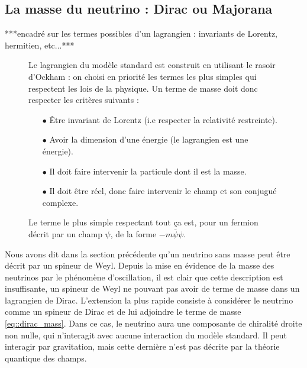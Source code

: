         \subsection{La masse du neutrino : Dirac ou Majorana}\label{sec::dirac_majorana}
        
	        ***encadré sur les termes possibles d'un lagrangien : invariants de Lorentz, hermitien, etc...***
	        \begin{figure}
		        \begin{tcolorbox}[title=Comment construire un terme de masse dans un lagrangien?]
		        	Le lagrangien du modèle standard est construit en utilisant le rasoir d'Ockham : on choisi en priorité les termes les plus simples qui respectent les lois de la physique. Un terme de masse doit donc respecter les critères suivants :
		        	\begin{itemize}
						\item[$\bullet$] Être invariant de Lorentz (i.e respecter la relativité restreinte).
						\item[$\bullet$] Avoir la dimension d'une énergie (le lagrangien est une énergie).
						\item[$\bullet$] Il doit faire intervenir la particule dont il est la masse.
						\item[$\bullet$] Il doit être réel, donc faire intervenir le champ et son conjugué complexe.
		        	\end{itemize}
		        	Le terme le plus simple respectant tout ça est, pour un fermion décrit par un champ $\psi$, de la forme $-m\bar{\psi}\psi$.
	        	\end{tcolorbox}
	        \end{figure}
	        
	        Nous avons dit dans la section précédente qu'un neutrino sans masse peut être décrit par un spineur de Weyl. Depuis la mise en évidence de la masse des neutrinos par le phénomène d'oscillation, il est clair que cette description est insuffisante, un spineur de Weyl ne pouvant pas avoir de terme de masse dans un lagrangien de Dirac. L'extension la plus rapide consiste à considérer le neutrino comme un spineur de Dirac et de lui adjoindre le terme de masse \eqref{eq::dirac_mass}. Dans ce cas, le neutrino aura une composante de chiralité droite non nulle, qui n'interagit avec aucune interaction du modèle standard. Il peut interagir par gravitation, mais cette dernière n'est pas décrite par la théorie quantique des champs. 
	        
